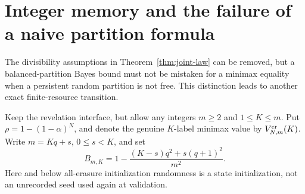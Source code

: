 \section{Integer memory and the failure of a naive partition formula}
\label{sec:integer-revelation}
The divisibility assumptions in Theorem~\ref{thm:joint-law} can be
removed, but a balanced-partition Bayes bound must not be mistaken for
a minimax equality when a persistent random partition is not free.
This distinction leads to another exact finite-resource transition.

Keep the revelation interface, but allow any integers $m\ge2$ and
$1\le K\le m$. Put $\rho=1-(1-\alpha)^N$, and denote the genuine
$K$-label minimax value by $V^{\rm er}_{N,m}(K)$. Write
$m=Kq+s$, $0\le s<K$, and set
\begin{equation}\label{eq:balanced-integer}
 B_{m,K}=1-\frac{(K-s)q^2+s(q+1)^2}{m^2}.
\end{equation}
Here and below all-erasure initialization randomness is a state
initialization, not an unrecorded seed used again at validation.

